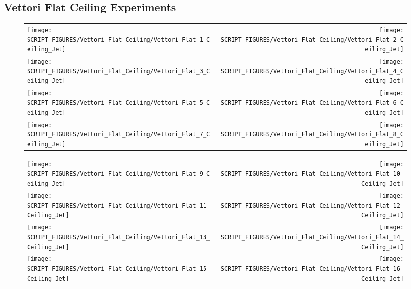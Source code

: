 \clearpage

\subsection{Vettori Flat Ceiling Experiments}

\begin{figure}[p]
\begin{tabular*}{\textwidth}{l@{\extracolsep{\fill}}r}
\texttt{[image: SCRIPT\_FIGURES/Vettori\_Flat\_Ceiling/Vettori\_Flat\_1\_Ceiling\_Jet]} &
\texttt{[image: SCRIPT\_FIGURES/Vettori\_Flat\_Ceiling/Vettori\_Flat\_2\_Ceiling\_Jet]} \\
\texttt{[image: SCRIPT\_FIGURES/Vettori\_Flat\_Ceiling/Vettori\_Flat\_3\_Ceiling\_Jet]} &
\texttt{[image: SCRIPT\_FIGURES/Vettori\_Flat\_Ceiling/Vettori\_Flat\_4\_Ceiling\_Jet]} \\
\texttt{[image: SCRIPT\_FIGURES/Vettori\_Flat\_Ceiling/Vettori\_Flat\_5\_Ceiling\_Jet]} &
\texttt{[image: SCRIPT\_FIGURES/Vettori\_Flat\_Ceiling/Vettori\_Flat\_6\_Ceiling\_Jet]} \\
\texttt{[image: SCRIPT\_FIGURES/Vettori\_Flat\_Ceiling/Vettori\_Flat\_7\_Ceiling\_Jet]} &
\texttt{[image: SCRIPT\_FIGURES/Vettori\_Flat\_Ceiling/Vettori\_Flat\_8\_Ceiling\_Jet]}
\end{tabular*}
\end{figure}

\begin{figure}[p]
\begin{tabular*}{\textwidth}{l@{\extracolsep{\fill}}r}
\texttt{[image: SCRIPT\_FIGURES/Vettori\_Flat\_Ceiling/Vettori\_Flat\_9\_Ceiling\_Jet]} &
\texttt{[image: SCRIPT\_FIGURES/Vettori\_Flat\_Ceiling/Vettori\_Flat\_10\_Ceiling\_Jet]} \\
\texttt{[image: SCRIPT\_FIGURES/Vettori\_Flat\_Ceiling/Vettori\_Flat\_11\_Ceiling\_Jet]} &
\texttt{[image: SCRIPT\_FIGURES/Vettori\_Flat\_Ceiling/Vettori\_Flat\_12\_Ceiling\_Jet]} \\
\texttt{[image: SCRIPT\_FIGURES/Vettori\_Flat\_Ceiling/Vettori\_Flat\_13\_Ceiling\_Jet]} &
\texttt{[image: SCRIPT\_FIGURES/Vettori\_Flat\_Ceiling/Vettori\_Flat\_14\_Ceiling\_Jet]} \\
\texttt{[image: SCRIPT\_FIGURES/Vettori\_Flat\_Ceiling/Vettori\_Flat\_15\_Ceiling\_Jet]} &
\texttt{[image: SCRIPT\_FIGURES/Vettori\_Flat\_Ceiling/Vettori\_Flat\_16\_Ceiling\_Jet]}
\end{tabular*}
\end{figure}

